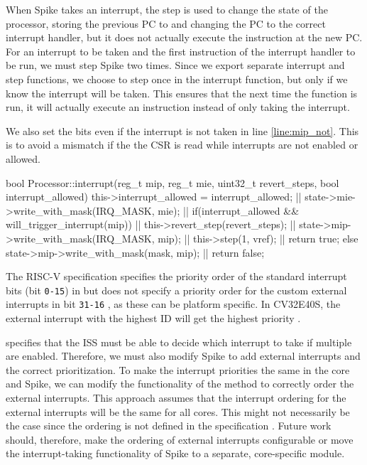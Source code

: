 When Spike takes an interrupt, the step is used to change the state of the processor, storing the previous PC to  and changing the PC to the correct interrupt handler, but it does not actually execute the instruction at the new PC. For an interrupt to be taken and the first instruction of the interrupt handler to be run, we must step Spike two times. Since we export separate interrupt and step functions, we choose to step once in the interrupt function, but only if we know the interrupt will be taken. This ensures that the next time the  function is run, it will actually execute an instruction instead of only taking the interrupt. 


We also set the  bits even if the interrupt is not taken in line \ref{line:mip_not}. This is to avoid a mismatch if the the  CSR is read while interrupts are not enabled or allowed.




\begin{clisting}[label=lst:interrupt, caption=The function used to apply interrupt in spike.,escapechar=|]
bool Processor::interrupt(reg_t mip, reg_t mie, uint32_t revert_steps, bool interrupt_allowed) {
  this->interrupt_allowed = interrupt_allowed; |\label{line:interrupt_allowed}|
  state->mie->write_with_mask(IRQ_MASK, mie); |\label{line:mie}|
  if(interrupt_allowed && will_trigger_interrupt(mip)) { |\label{line:will_trigger}|
    this->revert_step(revert_steps); |\label{line:revert}|
    state->mip->write_with_mask(IRQ_MASK, mip); |\label{line:mip}|
    this->step(1, vref); |\label{line:step}|
    return true;
  } else {
    state->mip->write_with_mask(mask, mip); |\label{line:mip_not}|
    return false;
  }
} 
\end{clisting}

The RISC-V specification specifies the priority order of the standard interrupt bits (bit \texttt{0-15}) in  but does not specify a priority order for the custom external interrupts in bit \texttt{31-16} \cite{watermanRISCVInstructionSet2021}, as these can be platform specific. In CV32E40S, the external interrupt with the highest ID will get the highest priority \cite{openhwgroupExceptionsInterruptsCOREV2023}.


 specifies that the ISS must be able to decide which interrupt to take if multiple are enabled. Therefore, we must also modify Spike to add external interrupts and the correct prioritization.
To make the interrupt priorities the same in the core and Spike, we can modify the functionality of the  method to correctly order the external interrupts. 
This approach assumes that the interrupt ordering for the external interrupts will be the same for all cores. This might not necessarily be the case since the ordering is not defined in the specification \cite{watermanRISCVInstructionSet2021}. Future work should, therefore, make the ordering of external interrupts configurable or move the interrupt-taking functionality of Spike to a separate, core-specific module.






